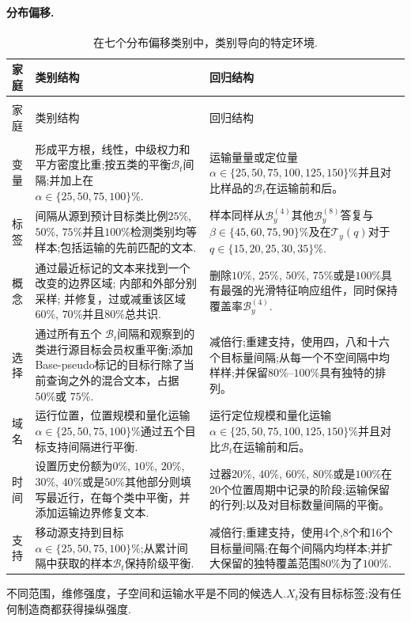 \paragraph{分布偏移.}
\begingroup
  \footnotesize
  \setlength{\LTpre}{0.45\baselineskip}
  \setlength{\LTpost}{0.45\baselineskip}
  \begin{longtable}{@{}>{\raggedright\arraybackslash}p{}
                      >{\raggedright\arraybackslash}p{}
                      >{\raggedright\arraybackslash}p{}@{}}
    \caption{在七个分布偏移类别中，类别导向的特定环境.}
    \label{tab:specific-shift-contexts} \\
    \toprule 家庭&类别结构&回归结构\\
    \midrule
    \endfirsthead
    \multicolumn{3}{@{}l}{\tablename~\thetable\ （续）} \\
    \toprule 家庭&类别结构&回归结构\\
    \midrule
    \endhead
    \midrule
    \multicolumn{3}{r@{}}{在下一页继续} \\
    \endfoot
    \bottomrule
    \endlastfoot 变量&形成平方根，线性，中级权力和平方密度比重;按五类的平衡$\mathcal B_t$间隔;并加上在$\alpha\in\{25,50,75,100\}\%$.
      &运输量量或定位量$\alpha\in\{25,50,75,100,125,150\}\%$并且对比样品的$\mathcal B_t$在运输前和后。\\
标签&间隔从源到预计目标类比例$25\%$, $50\%$, $75\%$并且$100\%$检测类别均等样本;包括运输的先前匹配的文本.
      &样本同样从$\mathcal B_y^{(4)}$其他$\mathcal B_y^{(8)}$答复与$\beta\in\{45,60,75,90\}\%$及在$\mathcal T_y(q)$对于$q\in\{15,20,25,30,35\}\%$. \\
概念&通过最近标记的文本来找到一个改变的边界区域; 内部和外部分别采样; 并修复，过或减重该区域$60\%$, $70\%$并且$80\%$总共识.
      &删除$10\%$, $25\%$, $50\%$, $75\%$或是$100\%$具有最强的光滑特征响应组件，同时保持覆盖率$\mathcal B_y^{(4)}$. \\
选择 & 通过所有五个 $\mathcal B_t$间隔和观察到的类进行源目标会员权重平衡;添加Base-pseudo标记的目标行除了当前查询之外的混合文本，占据 $50\%$或 $75\%$.
      &减倍行;重建支持，使用四，八和十六个目标量间隔;从每一个不空间隔中均样样;并保留$80\%$--$100\%$具有独特的排列。\\
域名&运行位置，位置规模和量化运输$\alpha\in\{25,50,75,100\}\%$通过五个目标支持间隔进行平衡.&运行定位规模和量化运输$\alpha\in\{25,50,75,100,125,150\}\%$并且对比$\mathcal B_t$在运输前和后。\\
时间&设置历史份额为$0\%$, $10\%$, $20\%$, $30\%$, $40\%$或是$50\%$其他部分则填写最近行，在每个类中平衡，并添加运输边界修复文本.
      &过器$20\%$, $40\%$, $60\%$, $80\%$或是$100\%$在20个位置周期中记录的阶段;运输保留的行列;以及对目标数量间隔的平衡。\\
支持&移动源支持到目标$\alpha\in\{25,50,75,100\}\%$;从累计间隔中获取的样本$\mathcal B_t$保持阶级平衡.&减倍行;重建支持，使用4个,8个和16个目标量间隔;在每个间隔内均样本;并扩大保留的独特覆盖范围$80\%$为了$100\%$. \\
  \end{longtable}
\endgroup

不同范围，维修强度，子空间和运输水平是不同的候选人.$X_t$没有目标标签;没有任何制造商都获得操纵强度.
